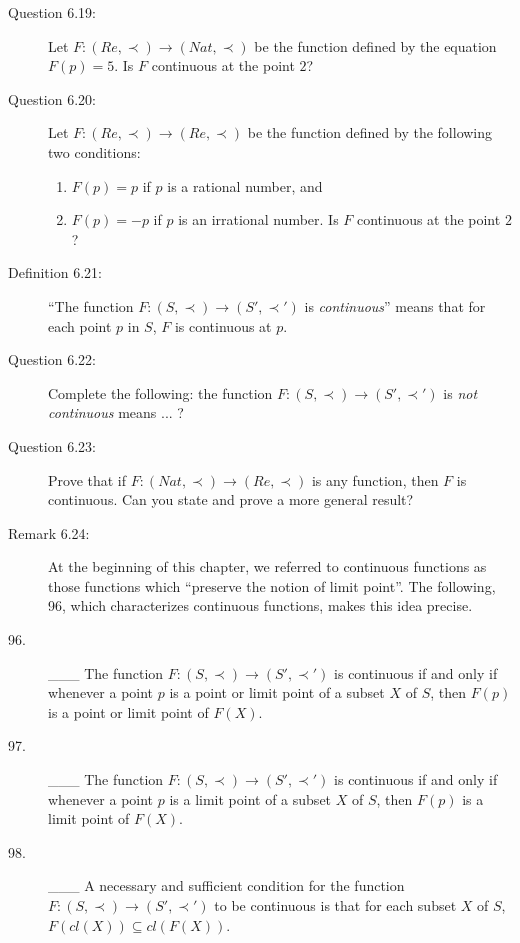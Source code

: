 \documentclass{book}
\begin{document}
\begin{description}
\item[Question 6.19:] Let $F: (Re, \prec) \rightarrow (Nat, \prec)$ be the function defined by the equation $F(p) = 5$. Is $F$ continuous at the point $2$?

\item[Question 6.20:] Let $F: (Re, \prec) \rightarrow (Re, \prec)$ be the function defined by the following two conditions:
\begin{enumerate}[\hspace{1cm}(a)]
  \item $F(p) = p$ if $p$ is a rational number, and 
  \item $F(p) = -p$ if $p$ is an irrational number. Is $F$ continuous at the point $2$?
\end{enumerate}

\item[Definition 6.21:] ``The function $F: (S, \prec) \rightarrow (S', \prec ')$ is \emph{continuous}'' means that for each point $p$ in $S$, $F$ is continuous at $p$.

\item[Question 6.22:] Complete the following: the function $F: (S, \prec) \rightarrow (S', \prec ')$ is \emph{not continuous} means ... ?

\item[Question 6.23:] Prove that if $F: (Nat, \prec) \rightarrow (Re, \prec)$ is any function, then $F$ is continuous. Can you state and prove a more general result?

\item[Remark 6.24:] At the beginning of this chapter, we referred to continuous functions as those functions which ``preserve the notion of limit point''. The following, 96, which characterizes continuous functions, makes this idea precise.

\item[96.] \_\_\_ The function $F: (S, \prec) \rightarrow (S', \prec ')$ is continuous if and only if whenever a point $p$ is a point or limit point of a subset $X$ of $S$, then $F(p)$ is a point or limit point of $F(X)$.

\item[97.] \_\_\_ The function $F: (S, \prec) \rightarrow (S', \prec ')$ is continuous if and only if whenever a point $p$ is a limit point of a subset $X$ of $S$, then $F(p)$ is a limit point of $F(X)$.

\item[98.] \_\_\_ A necessary and sufficient condition for the function $F: (S, \prec) \rightarrow (S', \prec ')$ to be continuous is that for each subset $X$ of $S$, $F(cl(X)) \subseteq cl(F(X))$.


\end{description}
\end{document}
